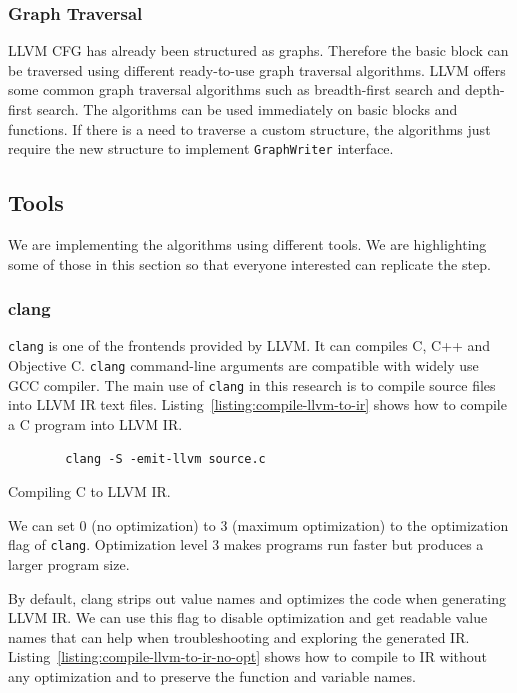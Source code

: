 \subsubsection{Graph Traversal}

LLVM CFG has already been structured as graphs. Therefore the basic block can be
traversed using different ready-to-use graph traversal algorithms. LLVM offers
some common graph traversal algorithms such as breadth-first search and
depth-first search. The algorithms can be used immediately on basic blocks and
functions. If there is a need to traverse a custom structure, the algorithms
just require the new structure to implement \texttt{GraphWriter} interface.

\subsection{Tools}

We are implementing the algorithms using different tools. We are highlighting
some of those in this section so that everyone interested can replicate the
step.

\subsubsection{clang}

\texttt{clang} is one of the frontends provided by LLVM. It can compiles C, C++
and Objective C. \texttt{clang} command-line arguments are compatible with
widely use GCC compiler. The main use of \texttt{clang} in this research is to
compile source files into LLVM IR text files.
Listing~\ref{listing:compile-llvm-to-ir} shows how to compile a C program into
LLVM IR. 

\begin{listing}[h!]
    \begin{verbatim}
        clang -S -emit-llvm source.c
    \end{verbatim}
    \caption{Compiling C to LLVM IR.}    
    \label{listing:compile-llvm-to-ir}
\end{listing}
    
We can set 0 (no optimization) to 3 (maximum optimization) to the optimization
flag of \texttt{clang}. Optimization level 3 makes programs run faster but
produces a larger program size.

By default, clang strips out value names and optimizes the code when generating
LLVM IR. We can use this flag to disable optimization and get readable value
names that can help when troubleshooting and exploring the generated IR.
Listing~\ref{listing:compile-llvm-to-ir-no-opt} shows how to compile to IR
without any optimization and to preserve the function and variable names.

